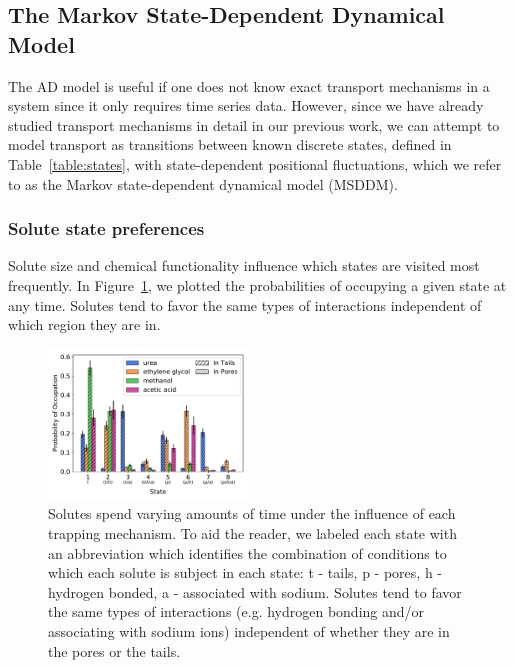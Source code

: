 \documentclass[aps,pre,preprint,groupedaddress]{revtex4-2}
\begin{document}
  \subsection{The Markov State-Dependent Dynamical Model}\label{section:msm_results}
  
  The AD model is useful if one does not know exact transport mechanisms 
  in a system since it only requires time series data. However, since we have
  already studied transport mechanisms in detail in our previous work, we can
  attempt to model transport as transitions between known discrete
  states, defined in Table~\ref{table:states}, with state-dependent positional
  fluctuations, which we refer to as the Markov state-dependent dynamical model (MSDDM).

  \subsubsection{Solute state preferences}\label{section:state_preferences}

  Solute size and chemical functionality influence which states are visited most frequently.
  In Figure~\ref{fig:state_probabilities}, we plotted the probabilities of occupying
  a given state at any time. Solutes tend to favor the same types of interactions 
  independent of which region they are in.
  
  \begin{figure}
  \centering
  \includegraphics[width=0.475\textwidth]{state_probabilities.pdf}
  \caption{Solutes spend varying amounts of time under the influence of each
  trapping mechanism. To aid the reader, we labeled each state with an abbreviation which
  identifies the combination of conditions to which each solute is subject in each state:
  t - tails, p - pores, h - hydrogen bonded, a - associated with sodium. Solutes tend to 
  favor the same types of interactions (e.g. hydrogen bonding and/or associating with sodium
  ions) independent of whether they are in the pores or the tails.}\label{fig:state_probabilities}
  \end{figure}
\end{document}
